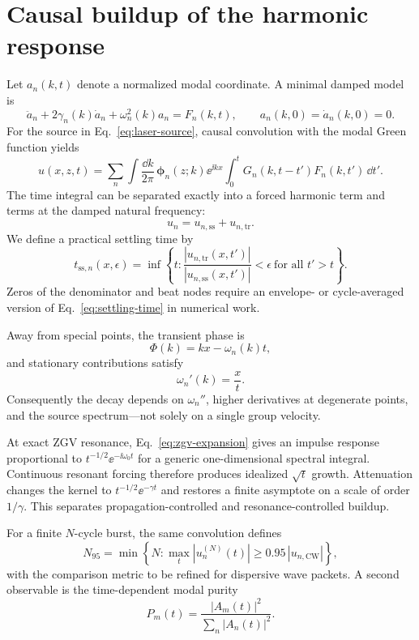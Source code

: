 \section{Causal buildup of the harmonic response}

Let $a_n(k,t)$ denote a normalized modal coordinate. A minimal damped model is
\begin{equation}
 \ddot a_n+2\gamma_n(k)\dot a_n+\omega_n^2(k)a_n=F_n(k,t),
 \qquad a_n(k,0)=\dot a_n(k,0)=0.
 \label{eq:modal-oscillator}
\end{equation}
For the source in Eq.~\eqref{eq:laser-source}, causal convolution with the modal
Green function yields
\begin{equation}
 u(x,z,t)=\sum_n\int\frac{\dd k}{2\pi}\,
 \bm\phi_n(z;k)\ee^{\ii kx}
 \int_0^t G_n(k,t-t')F_n(k,t')\,\dd t'.
 \label{eq:causal-response}
\end{equation}
The time integral can be separated exactly into a forced harmonic term and terms
at the damped natural frequency:
\begin{equation}
  u_n=u_{n,\mathrm{ss}}+u_{n,\mathrm{tr}}.
\end{equation}
We define a practical settling time by
\begin{equation}
 t_{\mathrm{ss},n}(x,\epsilon)=
 \inf\left\{t:\frac{|u_{n,\mathrm{tr}}(x,t')|}
 {|u_{n,\mathrm{ss}}(x,t')|}<\epsilon
 \ \text{for all }t'>t\right\}.
 \label{eq:settling-time}
\end{equation}
Zeros of the denominator and beat nodes require an envelope- or cycle-averaged
version of Eq.~\eqref{eq:settling-time} in numerical work.

Away from special points, the transient phase is
\begin{equation}
 \Phi(k)=kx-\omega_n(k)t,
\end{equation}
and stationary contributions satisfy
\begin{equation}
 \omega_n'(k)=\frac{x}{t}.
 \label{eq:stationary-phase}
\end{equation}
Consequently the decay depends on $\omega_n''$, higher derivatives at degenerate
points, and the source spectrum---not solely on a single group velocity.

At exact ZGV resonance, Eq.~\eqref{eq:zgv-expansion} gives an impulse response
proportional to $t^{-1/2}\ee^{-\ii\omega_0t}$ for a generic one-dimensional
spectral integral. Continuous resonant forcing therefore produces idealized
$\sqrt{t}$ growth. Attenuation changes the kernel to
$t^{-1/2}\ee^{-\gamma t}$ and restores a finite asymptote on a scale of order
$1/\gamma$. This separates propagation-controlled and resonance-controlled
buildup.

For a finite $N$-cycle burst, the same convolution defines
\begin{equation}
 N_{95}=\min\left\{N:\max_t|u_n^{(N)}(t)|
 \geq0.95\,|u_{n,\mathrm{CW}}|\right\},
\end{equation}
with the comparison metric to be refined for dispersive wave packets. A second
observable is the time-dependent modal purity
\begin{equation}
 P_m(t)=\frac{|A_m(t)|^2}{\sum_n|A_n(t)|^2}.
\end{equation}
